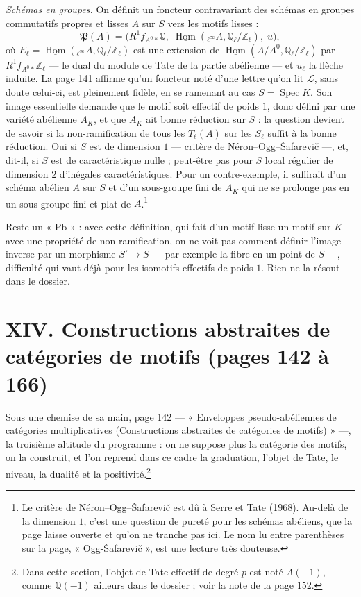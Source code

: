 \documentclass[11pt,a4paper]{article}
\begin{document}
\emph{Schémas en groupes.} On définit un foncteur contravariant des schémas en
groupes commutatifs propres et lisses $A$ sur $S$ vers les motifs lisses :
\[
\mathfrak{P}(A) = \bigl( R^{1}f_{A^{0}*}\mathbb{Q} ,\;
\underline{\operatorname{Hom}}({}_{\ell^{\infty}}A, \mathbb{Q}_{\ell}/\mathbb{Z}_{\ell}) ,\;
u \bigr) ,
\]
où $E_{\ell} = \underline{\operatorname{Hom}}({}_{\ell^{\infty}}A,
\mathbb{Q}_{\ell}/\mathbb{Z}_{\ell})$ est une extension de
$\underline{\operatorname{Hom}}(A/A^{0}, \mathbb{Q}_{\ell}/\mathbb{Z}_{\ell})$ par
$R^{1}f_{A^{0}*}\mathbb{Z}_{\ell}$ --- le dual du module de Tate de la partie
abélienne --- et $u_{\ell}$ la flèche induite. La page 141 affirme qu'un foncteur
noté d'une lettre qu'on lit $\mathcal{L}$, sans doute celui-ci, est pleinement
fidèle, en se ramenant au cas $S = \operatorname{Spec}K$. Son image
essentielle demande que le motif soit effectif de poids $1$, donc défini par une
variété abélienne $A_{K}$, et que $A_{K}$ ait bonne réduction sur $S$ : la question
devient de savoir si la non-ramification de tous les $T_{\ell}(A)$ sur les $S_{\ell}$
suffit à la bonne réduction. Oui si $S$ est de dimension $1$ --- critère de
Néron--Ogg--Šafarevič ---, et, dit-il, si $S$ est de caractéristique nulle ; peut-être
pas pour $S$ local régulier de dimension $2$ d'inégales caractéristiques. Pour un
contre-exemple, il suffirait d'un schéma abélien $A$ sur $S$ et d'un sous-groupe
fini de $A_{K}$ qui ne se prolonge pas en un sous-groupe fini et plat de
$A$.\footnote{Le critère de Néron--Ogg--Šafarevič est dû à Serre et Tate (1968). Au-delà
de la dimension $1$, c'est une question de pureté pour les schémas abéliens, que
la page laisse ouverte et qu'on ne tranche pas ici. Le nom lu entre parenthèses
sur la page, « Ogg-Šafarevič », est une lecture très douteuse.}

Reste un « Pb » : avec cette définition, qui fait d'un motif lisse un motif sur $K$
avec une propriété de non-ramification, on ne voit pas comment définir l'image
inverse par un morphisme $S' \to S$ --- par exemple la fibre en un point de $S$ ---,
difficulté qui vaut déjà pour les isomotifs effectifs de poids $1$. Rien ne la
résout dans le dossier.

\section*{XIV. Constructions abstraites de catégories de motifs (pages 142 à 166)}

Sous une chemise de sa main, page 142 --- « Enveloppes pseudo-abéliennes de
catégories multiplicatives (Constructions abstraites de catégories de motifs) » ---,
la troisième altitude du programme : on ne suppose plus la catégorie des motifs, on
la construit, et l'on reprend dans ce cadre la graduation, l'objet de Tate, le
niveau, la dualité et la positivité.\footnote{Dans cette section, l'objet de Tate
effectif de degré $p$ est noté $\Lambda(-1)$, comme $\mathbb{Q}(-1)$ ailleurs dans le
dossier ; voir la note de la page 152.}
\end{document}
